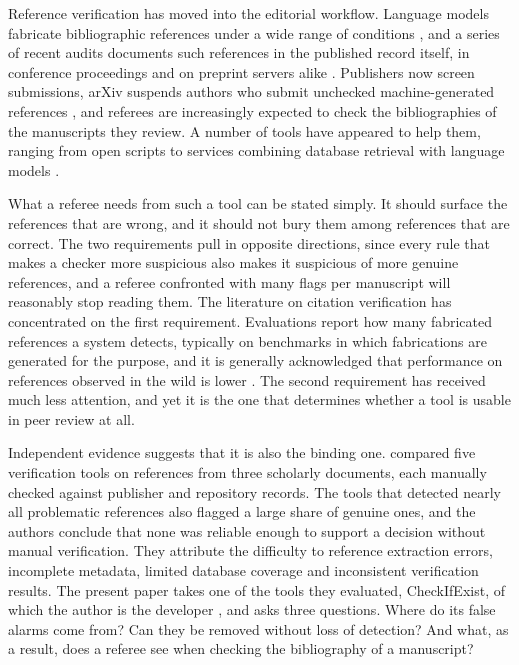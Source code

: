 \documentclass[pdflatex,sn-apa]{sn-jnl}
\begin{document}
Reference verification has moved into the editorial workflow. Language models fabricate bibliographic references under a wide range of conditions \citep{bhattacharyya2023, walters2023, day2023}, and a series of recent audits documents such references in the published record itself, in conference proceedings and on preprint servers alike \citep{sakai2026, zhao2026, russinovich2026, naturesocsci2026, naturepolluting2026}. Publishers now screen submissions, arXiv suspends authors who submit unchecked machine-generated references \citep{naturebanned2026}, and referees are increasingly expected to check the bibliographies of the manuscripts they review. A number of tools have appeared to help them, ranging from open scripts to services combining database retrieval with language models \citep{abbonato2026, russinovich2026, shi2026, khajavi2026}.

What a referee needs from such a tool can be stated simply. It should surface the references that are wrong, and it should not bury them among references that are correct. The two requirements pull in opposite directions, since every rule that makes a checker more suspicious also makes it suspicious of more genuine references, and a referee confronted with many flags per manuscript will reasonably stop reading them. The literature on citation verification has concentrated on the first requirement. Evaluations report how many fabricated references a system detects, typically on benchmarks in which fabrications are generated for the purpose, and it is generally acknowledged that performance on references observed in the wild is lower \citep{shi2026}. The second requirement has received much less attention, and yet it is the one that determines whether a tool is usable in peer review at all.

Independent evidence suggests that it is also the binding one. \citet{badalova2026} compared five verification tools on references from three scholarly documents, each manually checked against publisher and repository records. The tools that detected nearly all problematic references also flagged a large share of genuine ones, and the authors conclude that none was reliable enough to support a decision without manual verification. They attribute the difficulty to reference extraction errors, incomplete metadata, limited database coverage and inconsistent verification results. The present paper takes one of the tools they evaluated, CheckIfExist, of which the author is the developer \citep{abbonato2026}, and asks three questions. Where do its false alarms come from? Can they be removed without loss of detection? And what, as a result, does a referee see when checking the bibliography of a manuscript?
\end{document}
